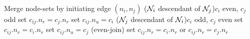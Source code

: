 \begin{algorithm}[htbp]
  
    \BlankLine
  
    Merge node-sets by initiating edge $(n_i, n_j)$\;
    \uIf($\mathcal{N}_i$ descendant of $\mathcal{N}_j$){$c_i$ even, $c_j$ odd}{
      set $c_{ij}.n_r = c_j.n_r$\;
      set $c_{ij}.n_u = c_i$
    }
    \uElseIf($\mathcal{N}_j$ descendant of $\mathcal{N}_i$){$c_i$ odd, $c_j$ even}{
      set $c_{ij}.n_r = c_i.n_r$\;
      set $c_{ij}.n_u = c_j$
    }
    \Else(even-join){
      set $c_{ij}.n_r = c_i.n_r$ or $c_{ij}.n_r = c_j.n_r$\;
    }
    \caption{}\label{algo:join}
  \end{algorithm}
  